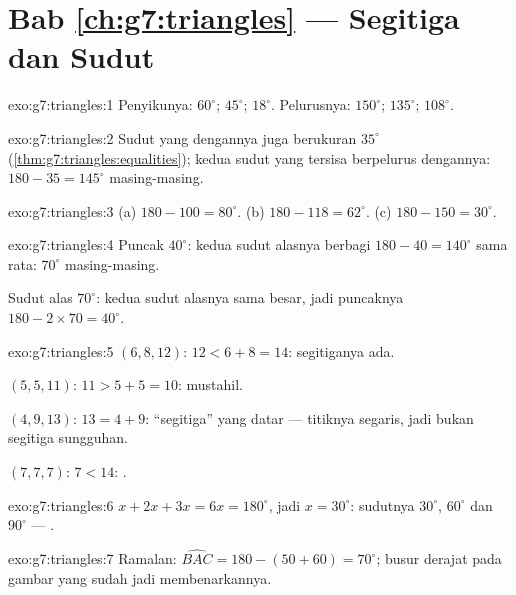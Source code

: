 \section*{Bab \ref{ch:g7:triangles} --- Segitiga dan Sudut}

\begin{solution}{exo:g7:triangles:1}
Penyikunya: $60^\circ$; $45^\circ$; $18^\circ$.
Pelurusnya: $150^\circ$; $135^\circ$; $108^\circ$.
\end{solution}

\begin{solution}{exo:g7:triangles:2}
Sudut yang  dengannya juga berukuran $35^\circ$
(\cref{thm:g7:triangles:equalities}); kedua sudut yang tersisa
berpelurus dengannya: $180 - 35 = 145^\circ$ masing-masing.
\end{solution}

\begin{solution}{exo:g7:triangles:3}
(a) $180 - 100 = 80^\circ$. \quad
(b) $180 - 118 = 62^\circ$. \quad
(c) $180 - 150 = 30^\circ$.
\end{solution}

\begin{solution}{exo:g7:triangles:4}
Puncak $40^\circ$: kedua sudut alasnya berbagi $180 - 40 = 140^\circ$
sama rata: $70^\circ$ masing-masing.

Sudut alas $70^\circ$: kedua sudut alasnya sama besar, jadi puncaknya
$180 - 2 \times 70 = 40^\circ$.
\end{solution}

\begin{solution}{exo:g7:triangles:5}
$(6, 8, 12)$: $12 < 6 + 8 = 14$: segitiganya ada.

$(5, 5, 11)$: $11 > 5 + 5 = 10$: mustahil.

$(4, 9, 13)$: $13 = 4 + 9$: ``segitiga'' yang datar --- titiknya
segaris, jadi bukan segitiga sungguhan.

$(7, 7, 7)$: $7 < 14$: .
\end{solution}

\begin{solution}{exo:g7:triangles:6}
$x + 2x + 3x = 6x = 180^\circ$, jadi $x = 30^\circ$: sudutnya
$30^\circ$, $60^\circ$ dan $90^\circ$ --- .
\end{solution}

\begin{solution}{exo:g7:triangles:7}
Ramalan: $\widehat{BAC} = 180 - (50 + 60) = 70^\circ$; busur derajat
pada gambar yang sudah jadi membenarkannya.
\end{solution}

